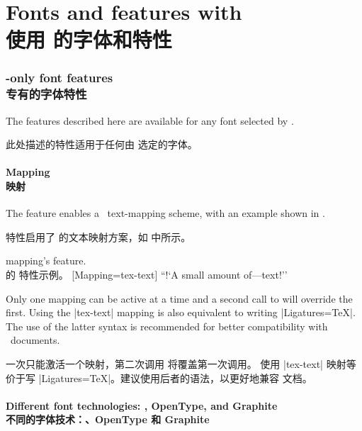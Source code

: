 \documentclass[a4paper]{l3doc}
\begin{document}
\part{Fonts and features with \XeTeX\\使用 \XeTeX 的字体和特性}
\label{sec:xetex-features}

\section{\XeTeX-only font features\\\XeTeX 专有的字体特性}

The features described here are available for any font
selected by .

此处描述的特性适用于任何由  选定的字体。

\subsection{Mapping\\映射}
\label{sec:mapping}

The  feature enables a \XeTeX\ text-mapping scheme, with an example shown in .

 特性启用了 \XeTeX 的文本映射方案，如  中所示。


\begin{Xexample}{mapping}{\XeTeX's  feature.\\\XeTeX 的  特性示例。}
  [Mapping=tex-text]
  ``!`A small amount of---text!''
\end{Xexample}

Only one mapping can be active at a time and a second call to 
will override the first.
Using the |tex-text| mapping is also equivalent to writing |Ligatures=TeX|.
The use of the latter syntax is recommended for better compatibility with
\LuaTeX\ documents.

一次只能激活一个映射，第二次调用  将覆盖第一次调用。
使用 |tex-text| 映射等价于写 |Ligatures=TeX|。建议使用后者的语法，以更好地兼容 \LuaTeX 文档。

\subsection{Different font technologies: \AAT, OpenType, and Graphite\\不同的字体技术：\AAT、OpenType 和 Graphite}\label{sec:renderer-xetex}
\end{document}
